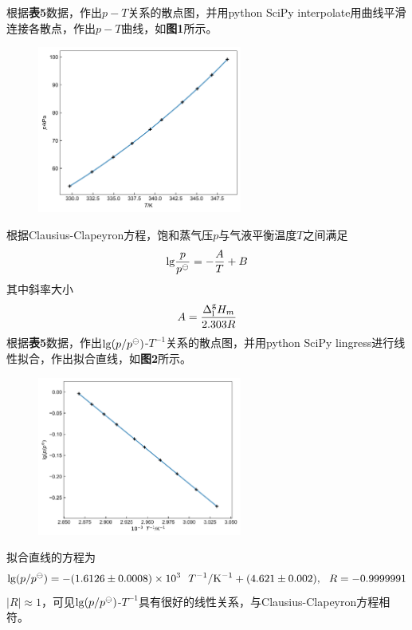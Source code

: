 \documentclass[12pt]{article}
\begin{document}
根据\textbf{表5}数据，作出$p-T$关系的散点图，并用python SciPy interpolate用曲线平滑连接各散点，作出$p-T$曲线，如\textbf{图1}所示。
\begin{figure}[h]
	\centering
	\includegraphics[width=0.6\textwidth]{1.jpg}
\end{figure}
\par
根据Clausius-Clapeyron方程，饱和蒸气压$p$与气液平衡温度$T$之间满足
$$
{\rm lg}\frac{p}{p^{\ominus}}=-\frac{A}{T}+B
$$
其中斜率大小
$$
A=\frac{\Delta^{\rm g}_{\rm l}H_{m}}{2.303R}
$$
根据\textbf{表5}数据，作出${\rm lg}(p/p^{\ominus})$-$T^{-1}$关系的散点图，并用python SciPy lingress进行线性拟合，作出拟合直线，如\textbf{图2}所示。
\begin{figure}[h]
	\centering
	\includegraphics[width=0.6\textwidth]{2.jpg}
\end{figure}
\par
拟合直线的方程为
$$
{\rm lg}(p/p^{\ominus})=-(1.6126\pm 0.0008)\times 10^{3} \ \ T^{-1}/{\rm K^{-1}}+(4.621\pm 0.002),\   \  R=-0.9999991
$$
$|R|\approx 1$，可见${\rm lg}(p/p^{\ominus})$-$T^{-1}$具有很好的线性关系，与Clausius-Clapeyron方程相符。\par 
\end{document}
